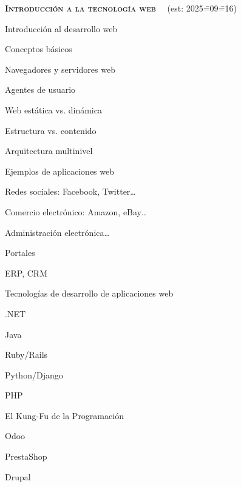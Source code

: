 \begin{longenum}
    \item \textbf{\textsc{Introducción a la tecnología web}} \ \ (est: 2025\==09\==16)
    \begin{longenum}
        \item Introducción al desarrollo web
        \begin{longenum}
            \item Conceptos básicos
            \begin{longenum}
                \item Navegadores y servidores web
                \item Agentes de usuario
                \item Web estática vs. dinámica
                \item Estructura vs. contenido
                \item Arquitectura multinivel
            \end{longenum}
            \item Ejemplos de aplicaciones web
            \begin{longenum}
                \item Redes sociales: Facebook, Twitter…
                \item Comercio electrónico: Amazon, eBay…
                \item Administración electrónica…
                \item Portales
                \item ERP, CRM
            \end{longenum}
            \item Tecnologías de desarrollo de aplicaciones web
            \begin{longenum}
                \item .NET
                \item Java
                \item Ruby/Rails
                \item Python/Django
                \item PHP
                \item El Kung-Fu de la Programación
                \begin{longenum}
                    \item Odoo
                    \item PrestaShop
                    \item Drupal

\end{longenum}
\end{longenum}
\end{longenum}
\end{longenum}
\end{longenum}
